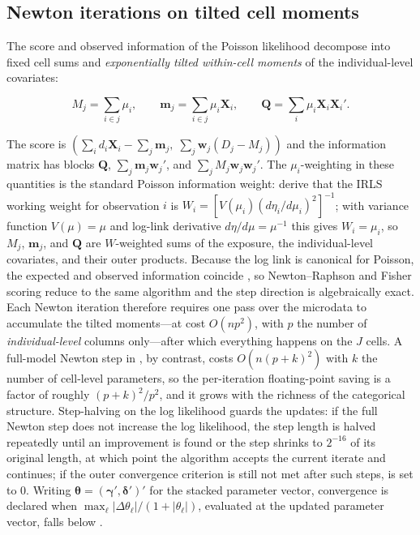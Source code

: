 \documentclass[12pt,a4paper]{article}
\begin{document}
\subsection{Newton iterations on tilted cell
moments}\label{newton-iterations-on-tilted-cell-moments}

The score and observed information of the Poisson likelihood decompose
into fixed cell sums and \emph{exponentially tilted within-cell moments}
\citep{jensen1995} of the individual-level covariates:

\begin{equation*}
M_j = \sum_{i \in j} \mu_i, \qquad
\mathbf{m}_j = \sum_{i \in j} \mu_i \mathbf{X}_i, \qquad
\mathbf{Q} = \sum_i \mu_i \mathbf{X}_i \mathbf{X}_i'.
\end{equation*}

The score is
\(\left(\sum_i d_i\mathbf{X}_i - \sum_j \mathbf{m}_j,\; \sum_j \mathbf{w}_j (D_j - M_j)\right)\)
and the information matrix has blocks \(\mathbf{Q}\),
\(\sum_j \mathbf{m}_j \mathbf{w}_j'\), and
\(\sum_j M_j \mathbf{w}_j \mathbf{w}_j'\). The \(\mu_i\)-weighting in
these quantities is the standard Poisson information weight:
\citet[sec.~2.5]{mccullagh1989} derive that the IRLS working weight for
observation \(i\) is \(W_i = [V(\mu_i)(d\eta_i/d\mu_i)^2]^{-1}\); with
variance function \(V(\mu)=\mu\) and log-link derivative
\(d\eta/d\mu = \mu^{-1}\) this gives \(W_i = \mu_i\), so \(M_j\),
\(\mathbf{m}_j\), and \(\mathbf{Q}\) are \(W\)-weighted sums of the
exposure, the individual-level covariates, and their outer products.
Because the log link is canonical for Poisson, the expected and observed
information coincide \citep[p.\,53]{mccullagh1989}, so Newton--Raphson
and Fisher scoring reduce to the same algorithm and the step direction
is algebraically exact. Each Newton iteration therefore requires one
pass over the microdata to accumulate the tilted moments---at cost
\(O(np^2)\), with \(p\) the number of \emph{individual-level} columns
only---after which everything happens on the \(J\) cells. A full-model
Newton step in , by contrast, costs \(O(n(p+k)^2)\) with
\(k\) the number of cell-level parameters, so the per-iteration
floating-point saving is a factor of roughly \((p+k)^2/p^2\), and it
grows with the richness of the categorical structure. Step-halving on
the log likelihood guards the updates: if the full Newton step does not
increase the log likelihood, the step length is halved repeatedly until
an improvement is found or the step shrinks to \(2^{-16}\) of its
original length, at which point the algorithm accepts the current
iterate and continues; if the outer convergence criterion is still not
met after  such steps,  is set to
\(0\). Writing \(\bm{\theta} = (\bm{\gamma}', \bm{\delta}')'\) for the
stacked parameter vector, convergence is declared when
\(\max_\ell |\Delta\theta_\ell| / (1 + |\theta_\ell|)\), evaluated at
the updated parameter vector, falls below .
\end{document}
